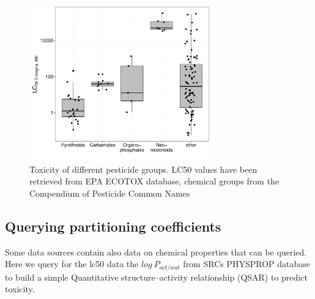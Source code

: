 \documentclass[article, shortnames]{jss}\usepackage[]{graphicx}\usepackage[]{color}
\providecommand{\DIFaddbegin}{} %
\providecommand{\DIFaddend}{} %
\providecommand{\DIFdelbegin}{} %
\providecommand{\DIFdelend}{} %
\begin{document}
\begin{figure}[ht]
\begin{CodeChunk}


{\centering \includegraphics[width=0.7\textwidth]{plot_lc50-1} 

}

\end{CodeChunk}
\caption{Toxicity of different pesticide groups. LC50 values have been retrieved from EPA ECOTOX database, chemical groups from the Compendium of Pesticide Common Names \citep{wood}}
\label{fig:fig2}
\end{figure}


\subsection[Querying partitioning coefficients]{Querying partitioning coefficients}
Some data sources contain also data on chemical properties that can be queried.
Here we query for the lc50 data the $log~P_{oct/wat}$ from SRCs PHYSPROP database to build a simple Quantitative structure–activity relationship (QSAR) to predict toxicity.

\DIFdelbegin %
\DIFdelend \DIFaddbegin \begin{CodeChunk}
\end{CodeChunk}
\DIFaddend 
\end{document}
